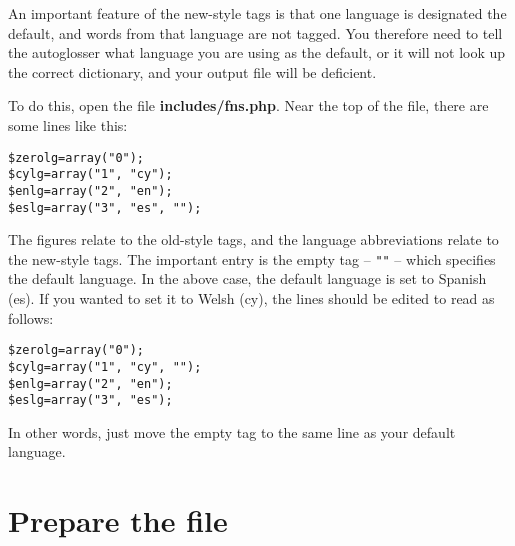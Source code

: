 \documentclass[a4paper,10pt]{article}
\begin{document}
An important feature of the new-style tags is that one language is designated the default, and words from that language are not tagged.  You therefore need to tell the autoglosser what language you are using as the default, or it will not look up the correct dictionary, and your output file will be deficient.

To do this, open the file \textbf{includes/fns.php}.  Near the top of the file, there are some lines like this:
\begin{verbatim}
$zerolg=array("0");
$cylg=array("1", "cy");
$enlg=array("2", "en");
$eslg=array("3", "es", "");
\end{verbatim}
The figures relate to the old-style tags, and the language abbreviations relate to the new-style tags.  The important entry is the empty tag -- \verb|""| -- which specifies the default language.  In the above case, the default language is set to Spanish (es).  If you wanted to set it to Welsh (cy), the lines should be edited to read as follows:
\begin{verbatim}
$zerolg=array("0");
$cylg=array("1", "cy", "");
$enlg=array("2", "en");
$eslg=array("3", "es");
\end{verbatim}
In other words, just move the empty tag to the same line as your default language.


\section{Prepare the file}
\label{sec:prepare}
\end{document}
